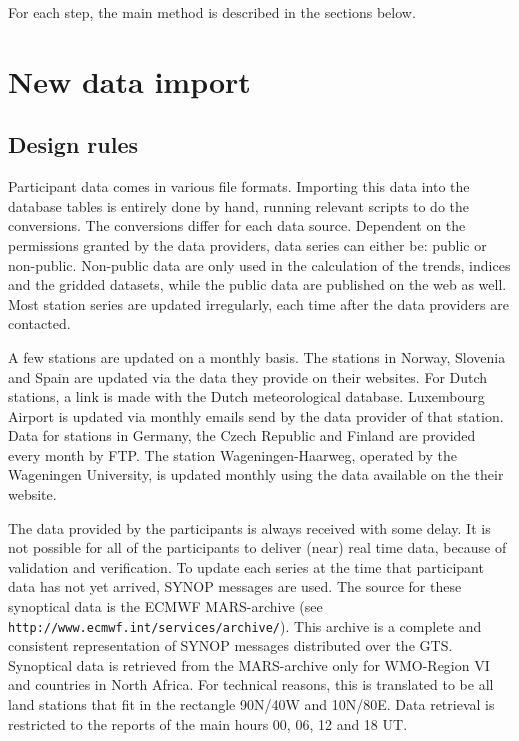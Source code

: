 \documentclass[a4paper,11pt]{article}
\begin{document}
For each step, the main method is described in the sections below. 


\section{New data import}
\subsection{Design rules}
\label{sec:data:design}

Participant data comes in various file formats. Importing this data
into the database tables is entirely done by hand, running relevant
scripts to do the conversions. The conversions differ for each data
source. Dependent on the permissions granted by the data providers,
data series can either be: public or non-public. Non-public data are
only used in the calculation of the trends, indices and the gridded
datasets, while the public data are published on the web as well. Most
station series are updated irregularly, each time after the data
providers are contacted.

A few stations are updated on a monthly basis. The stations in Norway,
Slovenia and Spain are updated via the data they provide on their
websites. For Dutch stations, a link is made with the Dutch
meteorological database. Luxembourg Airport is updated via monthly
emails send by the data provider of that station. Data for stations in
Germany, the Czech Republic and Finland are provided every month by FTP.
The station Wageningen-Haarweg, operated by the Wageningen University, is
updated monthly using the data available on the their website.

The data provided by the participants is always received with some
delay. It is not possible for all of the participants to deliver
(near) real time data, because of validation and verification. To
update each series at the time that participant data has not yet
arrived, SYNOP messages are used. The source for these synoptical data
is the ECMWF MARS-archive (see
{\tt http://www.ecmwf.int/services/archive/}). This archive is a complete
and consistent representation of SYNOP messages distributed over the
GTS. Synoptical data is retrieved from the MARS-archive only for
WMO-Region VI and countries in North Africa. For technical reasons,
this is translated to be all land stations that fit in the rectangle
90N/40W and 10N/80E. Data retrieval is restricted to the reports of
the main hours 00, 06, 12 and 18 UT.
\end{document}
